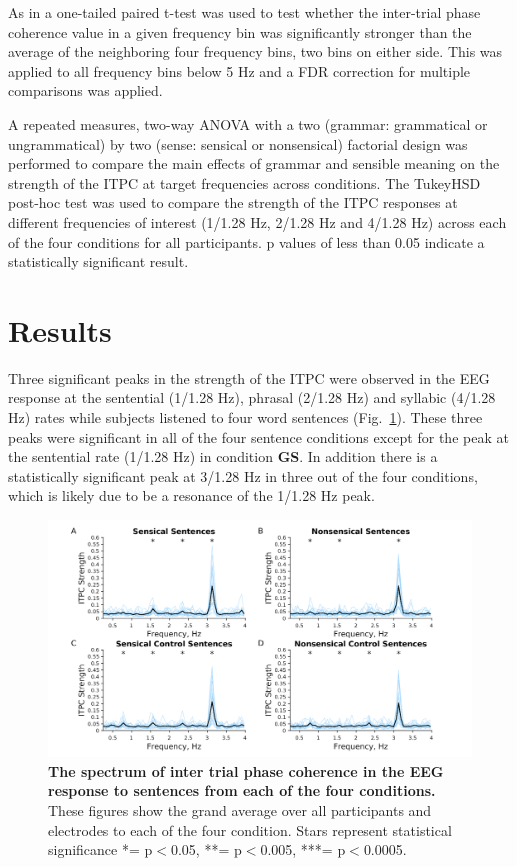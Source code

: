 \documentclass[a4paper,10pt,twoside]{article}
\begin{document}
As in \cite{DingEtAl2016} a one-tailed paired t-test was used to test whether the inter-trial phase coherence value in a given frequency bin was significantly stronger than the average of the neighboring four frequency bins, two bins on either side. This was applied to all frequency bins below 5 Hz and a FDR correction for multiple comparisons was applied. 

A repeated measures, two-way ANOVA with a two (grammar: grammatical or ungrammatical) by two (sense: sensical or nonsensical) factorial design was performed to compare the main effects of grammar and sensible meaning on the strength of the ITPC at target frequencies across conditions. The TukeyHSD post-hoc test was used to compare the strength of the ITPC responses at different frequencies of interest (1/1.28 Hz, 2/1.28 Hz and 4/1.28 Hz) across each of the four conditions for all participants. p values of less than 0.05 indicate a statistically significant result.


\section*{Results}

Three significant peaks in the strength of the ITPC were observed in the EEG response at the sentential (1/1.28 Hz), phrasal (2/1.28 Hz) and syllabic (4/1.28 Hz) rates while subjects listened to four word sentences (Fig.~\ref{Fig1}). These three peaks were significant in all of the four sentence conditions except for the peak at the sentential rate (1/1.28 Hz) in condition \textbf{GS}. In addition there is a statistically significant peak at 3/1.28 Hz in three out of the four conditions, which is likely due to be a resonance of the 1/1.28 Hz peak.

\begin{figure}[tbhp]
\includegraphics[width=\linewidth]{Grand_average_ITPC_per_condition_Grand_Average_ITPC_stats.png}
\caption{\textbf{The spectrum of inter trial phase coherence in the EEG response to sentences from each of the four conditions.} These figures show the grand average over all participants and electrodes to each of the four condition. Stars represent
statistical significance *= p$<$0.05, **= p$<$0.005, ***= p$<$0.0005.}
\label{Fig1}
\end{figure}
\end{document}
